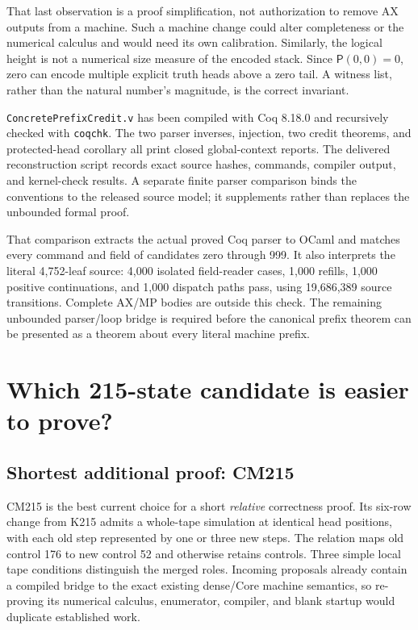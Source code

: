 \documentclass[11pt]{article}
\theoremstyle{definition}\newtheorem{definition}[theorem]{Definition}
\newcommand{\pair}[2]{\mathsf P(#1,#2)}
\begin{document}
That last observation is a proof simplification, not authorization to remove
AX outputs from a machine. Such a machine change could alter completeness or
the numerical calculus and would need its own calibration. Similarly, the
logical height is not a numerical size measure of the encoded stack. Since
$\pair00=0$, zero can encode multiple explicit truth heads above a zero tail.
A witness list, rather than the natural number's magnitude, is the correct
invariant.

\texttt{ConcretePrefixCredit.v} has been compiled with Coq 8.18.0 and recursively
checked with \texttt{coqchk}. The two parser inverses, injection, two credit
theorems, and protected-head corollary all print closed global-context reports.
The delivered reconstruction script records exact source hashes, commands,
compiler output, and kernel-check results. A separate finite parser comparison
binds the conventions to the released source model; it supplements rather
than replaces the unbounded formal proof.

That comparison extracts the actual proved Coq parser to OCaml and matches
every command and field of candidates zero through 999. It also interprets
the literal 4,752-leaf source: 4,000 isolated field-reader cases, 1,000 refills,
1,000 positive continuations, and 1,000 dispatch paths pass, using 19,686,389
source transitions. Complete AX/MP bodies are outside this check. The remaining
unbounded parser/loop bridge is required before the canonical prefix theorem
can be presented as a theorem about every literal machine prefix.

\section{Which 215-state candidate is easier to prove?}

\subsection{Shortest additional proof: CM215}

CM215 is the best current choice for a short \emph{relative} correctness proof.
Its six-row change from K215 admits a whole-tape simulation at identical head
positions, with each old step represented by one or three new steps. The
relation maps old control 176 to new control 52 and otherwise retains controls.
Three simple local tape conditions distinguish the merged roles. Incoming
proposals already contain a compiled bridge to the exact existing dense/Core
machine semantics, so re-proving its numerical calculus, enumerator, compiler,
and blank startup would duplicate established work.\cite{cm215,incoming}
\end{document}
